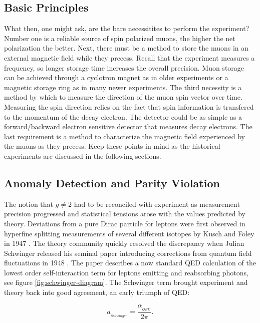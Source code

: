 \subsection{Basic Principles}
What then, one might ask, are the bare necessitites to perform the \gmtwo experiment?  Number one is a reliable source of spin polarized muons, the higher the net polarization the better.  Next, there must be a method to store the muons in an external magnetic field while they precess.  Recall that the experiment measures a frequency, so longer storage time increases the overall precision. Muon storage can be achieved through a cyclotron magnet as in older experiments or a magnetic storage ring as in many newer experiments.  The third necessity is a method by which to measure the direction of the muon spin vector over time.  Measuring the spin direction relies on the fact that spin information is transfered to the momentum of the decay electron.  The detector could be as simple as a forward/backward electron sensitive detector that measures decay electrons.  The last requirement is a method to characterize the magnetic field experienced by the muons as they precess.  Keep these points in mind as the historical experiments are discussed in the following sections.

\subsection{Anomaly Detection and Parity Violation}

The notion that $g \ne 2$ had to be reconciled with experiment as measurement precision progressed and statistical tensions arose with the values predicted by theory.  Deviations from a pure Dirac particle for leptons were first observed in hyperfine splitting measurements of several different isotopes by Kusch and Foley in 1947 \cite{kusch-foley}.  The theory community quickly resolved the discrepancy when Julian Schwinger released his seminal paper introducing corrections from quantum field fluctuations in 1948 \cite{schwinger}.  The paper describes a now standard QED calculation of the lowest order self-interaction term for leptons emitting and reabsorbing photons, see figure \ref{fig:schwinger-diagram}.  The Schwinger term brought experiment and theory back into good agreement, an early triumph of QED:

\begin{equation}
\label{eqn:schwinger-correction}
a_{_{Schwinger}} = \frac{\alpha_{_{QED}}}{2\pi}.
\end{equation}

